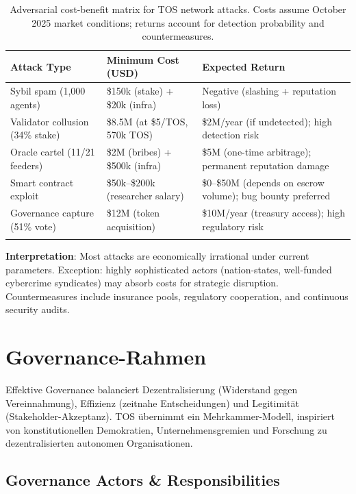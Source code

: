 \documentclass[11pt]{article}
\begin{document}
\begin{longtable}{@{}p{}p{}p{}@{}}
\toprule
\textbf{Attack Type} & \textbf{Minimum Cost (USD)} & \textbf{Expected Return} \\\midrule
Sybil spam (1,000 agents) & \$150k (stake) + \$20k (infra) & Negative (slashing + reputation loss) \\
Validator collusion (34\% stake) & \$8.5M (at \$5/TOS, 570k TOS) & \$2M/year (if undetected); high detection risk \\
Oracle cartel (11/21 feeders) & \$2M (bribes) + \$500k (infra) & \$5M (one-time arbitrage); permanent reputation damage \\
Smart contract exploit & \$50k--\$200k (researcher salary) & \$0--\$50M (depends on escrow volume); bug bounty preferred \\
Governance capture (51\% vote) & \$12M (token acquisition) & \$10M/year (treasury access); high regulatory risk \\
\bottomrule
\caption{Adversarial cost-benefit matrix for TOS network attacks. Costs assume October 2025 market conditions; returns account for detection probability and countermeasures.}
\end{longtable}

\textbf{Interpretation}: Most attacks are economically irrational under current parameters. Exception: highly sophisticated actors (nation-states, well-funded cybercrime syndicates) may absorb costs for strategic disruption. Countermeasures include insurance pools, regulatory cooperation, and continuous security audits.

\section{Governance-Rahmen}
\label{sec:governance}

Effektive Governance balanciert Dezentralisierung (Widerstand gegen Vereinnahmung), Effizienz (zeitnahe Entscheidungen) und Legitimität (Stakeholder-Akzeptanz). TOS übernimmt ein Mehrkammer-Modell, inspiriert von konstitutionellen Demokratien, Unternehmensgremien und Forschung zu dezentralisierten autonomen Organisationen.

\subsection{Governance Actors \& Responsibilities}
\end{document}
